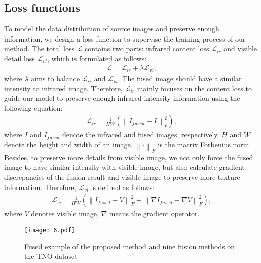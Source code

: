 \documentclass[journal]{IEEEtran}
\begin{document}
\subsection{Loss functions}
To model the data distribution of source images and preserve enough information, we design a loss function to supervise the training process of our method. The total loss $\mathcal{L}$ contains two parts: infrared content loss ${\mathcal{L}_{ir}}$ and visible detail loss ${\mathcal{L}_{vi}}$, which is formulated as follows:
\begin{equation}
\begin{split}
\mathcal{L}={\mathcal{L}_{ir}}+\lambda {\mathcal{L}_{vi}},
\end{split}
\end{equation}
where $\lambda$ aims to balance ${\mathcal{L}_{ir}}$ and ${\mathcal{L}_{vi}}$. The fused image should have a similar intensity to infrared image. Therefore, ${\mathcal{L}_{ir}}$ mainly focuses on the content loss to guide our model to preserve enough infrared intensity information using the following equation:
\begin{equation}
\begin{split}
{\mathcal{L}_{ir}}=\frac{1}{HW}\left( \left\| {{I}_{fused}}-I \right\|_{F}^{2} \right),
\end{split}
\end{equation}
where $I$ and ${{I}_{fused}}$ denote the infrared and fused images, respectively. $H$ and $W$ denote the height and width of an image. $\left\| \cdot  \right\|_{F}^{{}}$ is the matrix Forbenius norm. Besides, to preserve more details from visible image, we not only force the fused image to have similar intensity with visible image, but also calculate gradient discrepancies of the fusion result and visible image to preserve more texture information. Therefore, ${\mathcal{L}_{vi}}$ is defined as follows:
\begin{equation}
\begin{split}
{\mathcal{L}_{vi}}=\frac{1}{HW}\left( \left\| {{I}_{fused}}-V \right\|_{F}^{2}+\left\| \nabla {{I}_{fused}}-\nabla V \right\|_{F}^{2} \right),
\end{split}
\end{equation}
where $V$ denotes visible image, $\nabla $ means the gradient operator.


\begin{figure}[!t]
\centering
\texttt{[image: 6.pdf]}
\caption{Fused example of the proposed method and nine fusion methods on the TNO dataset}
\label{FIG:6}
\end{figure}
\end{document}
